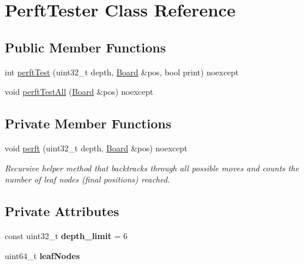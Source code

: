 \hypertarget{classPerftTester}{}\section{Perft\+Tester Class Reference}
\label{classPerftTester}
\subsection*{Public Member Functions}
\begin{DoxyCompactItemize}
\item 
int \mbox{\hyperlink{classPerftTester_aed268b09419b18b94d64a66a4bc9598f}{perft\+Test}} (uint32\+\_\+t depth, \mbox{\hyperlink{classBoard}{Board}} \&pos, bool print) noexcept
\item 
void \mbox{\hyperlink{classPerftTester_a993123204bd16a3b6d2185e6658fa66f}{perft\+Test\+All}} (\mbox{\hyperlink{classBoard}{Board}} \&pos) noexcept
\end{DoxyCompactItemize}
\subsection*{Private Member Functions}
\begin{DoxyCompactItemize}
\item 
void \mbox{\hyperlink{classPerftTester_a7fa4c10a5d72fb37434da764d72ccd85}{perft}} (uint32\+\_\+t depth, \mbox{\hyperlink{classBoard}{Board}} \&pos) noexcept
\begin{DoxyCompactList}\small\item\em Recursive helper method that backtracks through all possible moves and counts the number of leaf nodes (final positions) reached. \end{DoxyCompactList}\end{DoxyCompactItemize}
\subsection*{Private Attributes}
\begin{DoxyCompactItemize}
\item 
\mbox{\label{classPerftTester_afca3247344fbbf3c818bfd78c86811e0}} 
const uint32\+\_\+t {\bfseries depth\+\_\+limit} = 6
\item 
\mbox{\label{classPerftTester_aa662e5b636e1a16de1337b4e19eb5033}} 
uint64\+\_\+t {\bfseries leaf\+Nodes}
\end{DoxyCompactItemize}


